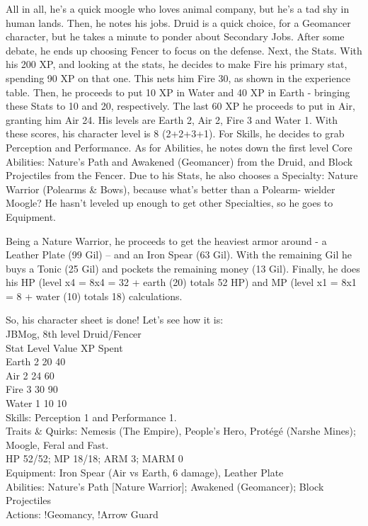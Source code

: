 \begin{multicols}{2}
\begin{mog}
All in all, he's a quick moogle who loves animal
company, but he's a tad shy in human lands.
Then, he notes his jobs. Druid is a quick choice,
for a Geomancer character, but he takes a minute to
ponder about Secondary Jobs. After some debate, he ends
up choosing Fencer to focus on the defense.
Next, the Stats. With his 200 XP, and looking at
the stats, he decides to make Fire his primary stat,
spending 90 XP on that one. This nets him Fire 30, as
shown in the experience table. Then, he proceeds to put
10 XP in Water and 40 XP in Earth - bringing these Stats
to 10 and 20, respectively. The last 60 XP he proceeds to
put in Air, granting him Air 24. His levels are Earth 2, Air
2, Fire 3 and Water 1. With these scores, his character
level is 8 (2+2+3+1). For Skills, he decides to grab
Perception and Performance.
As for Abilities, he notes down the first level Core
Abilities: Nature's Path and Awakened (Geomancer) from
the Druid, and Block Projectiles from the Fencer. Due to
his Stats, he also chooses a Specialty: Nature Warrior
(Polearms \& Bows), because what’s better than a Polearm-
wielder Moogle? He hasn't leveled up enough to get other
Specialties, so he goes to Equipment.

Being a Nature Warrior, he proceeds to get the
heaviest armor around - a Leather Plate (99 Gil) – and an
Iron Spear (63 Gil). With the remaining Gil he buys a
Tonic (25 Gil) and pockets the remaining money (13 Gil).
Finally, he does his HP (level x4 = 8x4 = 32 + earth (20)
totals 52 HP) and MP (level x1 = 8x1 = 8 + water (10)
totals 18) calculations.

So, his character sheet is done! Let's see how it is:\\
JBMog, 8th level Druid/Fencer\\
Stat Level Value XP Spent\\
Earth 2 20 40\\
Air 2 24 60\\
Fire 3 30 90\\
Water 1 10 10\\

Skills: Perception 1 and Performance 1.\\
Traits \& Quirks: Nemesis (The Empire), People's Hero,
Protégé (Narshe Mines); Moogle, Feral and Fast.\\
HP 52/52; MP 18/18; ARM 3; MARM 0\\
Equipment: Iron Spear (Air vs Earth, 6 damage), Leather
Plate\\
Abilities: Nature's Path [Nature Warrior]; Awakened
(Geomancer); Block Projectiles\\
Actions: !Geomancy, !Arrow Guard
\end{mog}
\end{multicols}